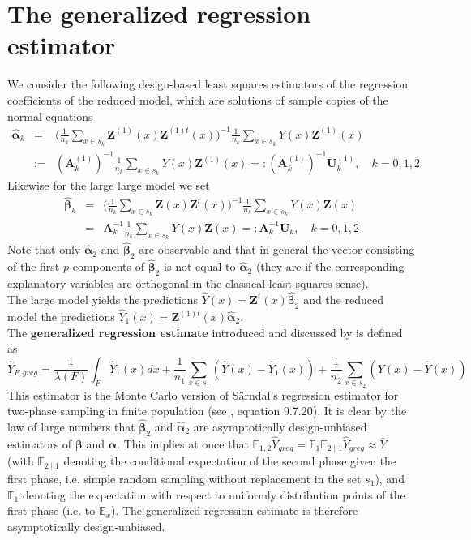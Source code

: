 \documentclass[a4paper,12pt,leqno, titlepage]{article}
\newcommand{\EX}{\mathbb{E}}
\begin{document}
\section{The generalized regression estimator}
We consider the following design-based least squares estimators of the regression coefficients of the reduced model, which are solutions of sample copies of the normal equations
\begin{eqnarray}\label{coeff1}
\hat{\pmb{\alpha}}_k &=& \Big(\frac{1}{n_k}\sum_{x\in{s}_k}\pmb{Z}^{(1)}(x)\pmb{Z}^{(1)t}(x)
\Big)^{-1}\frac{1}{n_k}\sum_{x\in{s}_k}Y(x)\pmb{Z}^{(1)}(x)\nonumber\\
&:=&(\pmb{A}^{(1)}_k)^{-1}
\frac{1}{n_k}\sum_{x\in{s}_k}Y(x)\pmb{Z}^{(1)}(x)=:(\pmb{A}^{(1)}_k)^{-1}\pmb{U}^{(1)}_k,\quad  k=0,1,2
\end{eqnarray}
Likewise for the large large model we set
\begin{eqnarray}\label{coeff2}
\hat{\pmb{\beta}}_{k}&=&\Big(\frac{1}{n_k}\sum_{x\in{s}_k}\pmb{Z}(x)\pmb{Z}^t(x)
\Big)^{-1}\frac{1}{n_k}\sum_{x\in{s}_k}Y(x)\pmb{Z}(x)\nonumber \\
&=&\pmb{A}^{-1}_k\frac{1}{n_k}\sum_{x\in{s}_k}Y(x)\pmb{Z}(x)=:\pmb{A}^{-1}_k\pmb{U}_k,\quad k=0,1,2
\end{eqnarray}
Note that only $\hat{\pmb{\alpha}}_2$ and $\hat{\pmb{\beta}}_2$ are observable and that
in general the vector consisting of the first $p$ components of $\hat{\pmb{\beta}}_{2}$ is not equal to $\hat{\pmb{\alpha}}_2$ (they are if the corresponding explanatory variables are orthogonal in the classical least squares sense).\\
The large model yields the predictions $\hat{Y}(x)=\pmb{Z}^t(x)\hat{\pmb{\beta}}_{2}$ and the reduced model the predictions $\hat{Y}_1(x)=\pmb{Z}^{(1)t}(x)\hat{\pmb{\alpha}}_2$.\\
The \textbf{generalized regression estimate} introduced and discussed by \cite{mandallazreport2,mandallaz3} is defined as
\begin{equation}\label{ygreg1}
\hat{Y}_{F,greg} = \frac{1}{\lambda(F)}\int_F \hat{Y}_1(x)dx
+\frac{1}{n_1}\sum_{x\in{s}_1}(\hat{Y}(x)-\hat{Y}_1(x))
+ \frac{1}{n_2}\sum_{x\in{s}_2}(Y(x)-\hat{Y}(x))
\end{equation}
This estimator is the Monte Carlo version of S\"{a}rndal's  regression estimator for two-phase sampling in finite population (see \cite{sarndal}, equation 9.7.20). It is clear by the law of large numbers that  $\hat{\pmb{\beta}}_2$ and $\hat{\pmb{\alpha}}_2$ are asymptotically design-unbiased estimators of $\pmb{\beta}$ and $\pmb{\alpha}$. This implies at once that $\EX_{1,2}\hat{Y}_{greg}= \EX_1\EX_{2 \mid 1}\hat{Y}_{greg} \approx \bar{Y}$ (with $\EX_{2 \mid 1}$ denoting the conditional expectation of the second phase given the first phase, i.e. simple random sampling without replacement in the set $s_1$), and $\EX_1$ denoting the expectation with respect to uniformly distribution points of the first phase (i.e. to $\EX_x$). The generalized regression estimate is therefore asymptotically design-unbiased.\\
\end{document}
